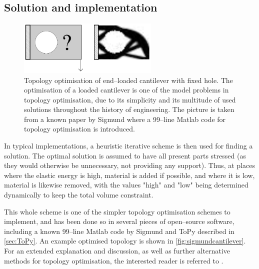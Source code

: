 \subsection{Solution and implementation}
\begin{figure}
\centering
\includegraphics[width=0.6\textwidth]{Pictures/TopOp/Sigmund_cantilever2d.png}
\caption{Topology optimisation of end--loaded cantilever with fixed hole. The optimisation of a loaded cantilever is one of the model problems in topology optimisation, due to its simplicity and its multitude of used solutions throughout the history of engineering. The picture is taken from a known paper by Sigmund \cite{sigmund200199} where a 99--line Matlab code for topology optimisation is introduced.} 
\label{fig:sigmundcantilever}
\end{figure}
In typical implementations, a heuristic iterative scheme is then used for finding a solution. The optimal solution is assumed to have all present parts stressed (as they would otherwise be unnecessary, not providing any support). Thus, at places where the elastic energy is high, material is added if possible, and where it is low, material is likewise removed, with the values "high" and "low" being determined dynamically to keep the total volume constraint. 

This whole scheme is one of the simpler topology optimisation schemes to implement, and has been done so in several pieces of open--source software, including a known 99--line Matlab code by Sigmund \cite{sigmund200199} and ToPy described in \autoref{sec:ToPy}. An example optimised topology is shown in \autoref{fig:sigmundcantilever}. For an extended explanation and discussion, as well as further alternative methods for topology optimisation, the interested reader is referred to \cite{bendsoe2003topology}.

